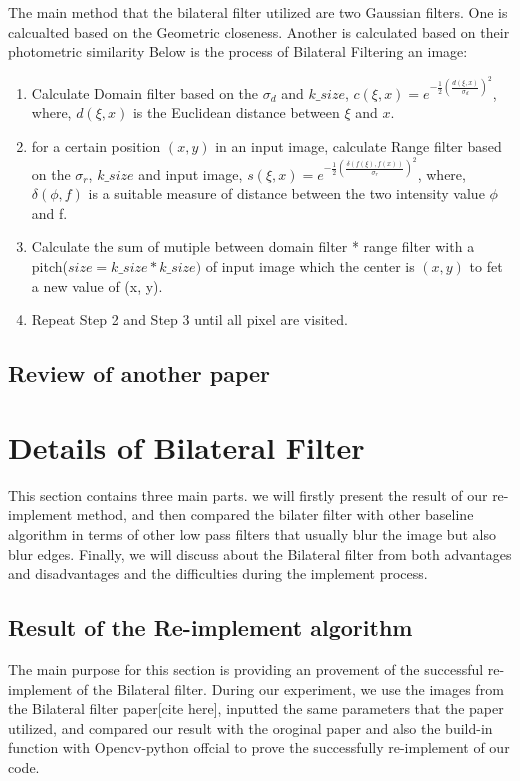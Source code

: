 \documentclass[12pt]{article}
\begin{document}
The main method that the bilateral filter utilized are two Gaussian filters. 
One is calcualted based on the Geometric closeness. 
Another is calculated based on their photometric similarity
Below is the process of Bilateral Filtering an image:

\begin{enumerate}[Step1:]
\item Calculate Domain filter based on the $\sigma_d$ and $k\_size$, $c(\xi, x) = e^{-\frac{1}{2}(\frac{d(\xi, x)}{\sigma_{d}})^2}$, where, $d(\xi, x)$ is the Euclidean distance between $\xi$ and $x$.
\item for a certain position $(x, y)$ in an input image, calculate Range filter based on the $\sigma_r$, $k\_size$ and input image, $s(\xi, x) = e^{-\frac{1}{2}(\frac{\delta(f(\xi), f(x))}{\sigma_{r}})^{2}}$, where, $\delta(\phi, f)$ is a suitable measure of distance between the two intensity value $\phi$ and f.
\item Calculate the sum of mutiple between domain filter * range filter with a pitch($size = k\_size * k\_size)$ of input image which the center is $(x, y)$ to fet a new value of (x, y).
\item Repeat Step 2 and Step 3 until all pixel are visited. 
\end{enumerate}



\subsection{Review of another paper}


\section{Details of Bilateral Filter}
\label{section Bilateral_filter}
This section contains three main parts. we will firstly present the result of our re-implement method, and then compared the bilater filter with other baseline algorithm in terms of other low pass filters that usually blur the image but also blur edges. 
Finally, we will discuss about the Bilateral filter from both advantages and disadvantages and the difficulties during the implement process.


\subsection{Result of the Re-implement algorithm}
\label{section reimplement}
The main purpose for this section is providing an provement of the successful re-implement of the Bilateral filter.
During our experiment, we use the images from the Bilateral filter paper[cite here], inputted the same parameters that the paper utilized, and compared our result with the oroginal paper and also the build-in function with Opencv-python offcial to prove the successfully re-implement of our code.
\end{document}
